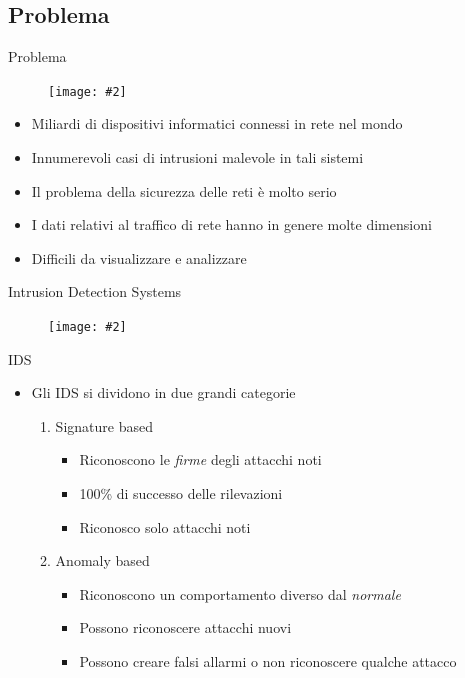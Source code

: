 \documentclass[xcolor={dvipsnames}]{beamer}%
\newcommand{\figcen}[2]{
	\begin{figure}
		\begin{center}
			\texttt{[image: \#2]}
		\end{center}
	\end{figure}
}
\begin{document}
	\subsection{Problema}
	
		\begin{frame}{Problema}
			\figcen{.5\textwidth}{iot}
			\begin{itemize}
				\item Miliardi di dispositivi informatici connessi in rete nel mondo
				\item Innumerevoli casi di intrusioni malevole in tali sistemi
				\item Il problema della sicurezza delle reti è molto serio
				\item I dati relativi al traffico di rete hanno in genere molte dimensioni
				\item Difficili da visualizzare e analizzare
			\end{itemize}
		\end{frame}
	
		\begin{frame}{Intrusion Detection Systems}
			\figcen{.5\textwidth}{guardia}
		\end{frame}
	
		\begin{frame}{IDS}
			\begin{itemize}
				\item Gli IDS si dividono in due grandi categorie
				\begin{enumerate}
					\footnotesize
					\item Signature based
					\begin{itemize}
						\footnotesize
						\item Riconoscono le \emph{firme} degli attacchi noti
						\item 100\% di successo delle rilevazioni
						\item Riconosco solo attacchi noti
					\end{itemize}
					\item Anomaly based
					\begin{itemize}
						\footnotesize
						\item Riconoscono un comportamento diverso dal \emph{normale}
						\item Possono riconoscere attacchi nuovi
						\item Possono creare falsi allarmi o non riconoscere qualche attacco
					\end{itemize}
				\end{enumerate}
			\end{itemize}
		\end{frame}
	
\end{document}

